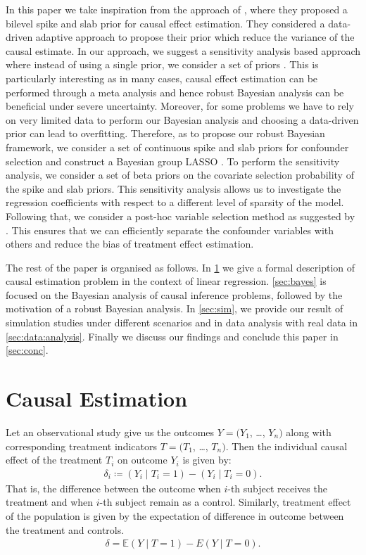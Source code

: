 \documentclass{amsart}
\begin{document}
In this paper we take inspiration from the approach of \citet{koch2020}, where
they proposed a bilevel spike and slab prior for causal effect 
estimation. They considered a data-driven adaptive approach to
propose their prior which reduce the variance of the causal estimate. 
In our approach,
we suggest a sensitivity analysis based approach where instead
of using a single prior, we consider a set of priors \cite{BERGER1990303}. This is particularly interesting as in
many cases, causal effect estimation can be performed through a 
meta analysis and hence robust Bayesian analysis can be beneficial
\cite{raices_cruz22} under severe uncertainty.
Moreover, for some problems we have to rely on very limited data to
perform our Bayesian analysis and choosing a data-driven prior
can lead to overfitting. Therefore, as to propose our
robust Bayesian framework,
we consider a set of continuous spike and slab priors \cite{ishwaran2005}
for confounder selection and construct a Bayesian group LASSO
\cite{xu2015}. To perform the sensitivity analysis, we consider
a set of beta priors on the covariate selection probability
of the spike and slab priors. This sensitivity analysis allows us
to investigate the regression coefficients with respect to a different
level of sparsity of the model. Following that, we consider a post-hoc
variable selection method as suggested by \citet{hahn2015}. This
ensures that we can efficiently separate the confounder variables
with others and reduce the bias of treatment effect estimation.

The rest of the paper is organised as follows. In \cref{sec:causal}
we give a formal description of causal estimation problem in the
context of linear regression. \cref{sec:bayes} is focused on the
Bayesian analysis of causal inference problems, followed by the
motivation of a robust Bayesian analysis. In \cref{sec:sim}, we
provide our result of simulation studies under different 
scenarios and in data analysis with real data in \cref{sec:data:analysis}. Finally we discuss our findings and 
conclude this paper in \cref{sec:conc}.

\section{Causal Estimation}\label{sec:causal}

Let an observational study give us the outcomes $Y=(Y_1$, \dots, $Y_n)$ along with 
corresponding treatment indicators $T=(T_1$, \dots, $T_n)$. Then the
individual causal
effect of the treatment $T_i$ on outcome $Y_i$ is given by:
\begin{align}
\delta_i \coloneqq (Y_i\mid T_i=1) - (Y_i\mid T_i=0).
\end{align}
That is, the difference between the outcome when $i$-th subject receives
the treatment and when $i$-th subject remain as a control. Similarly, treatment 
effect of the population is given by the expectation of difference
in outcome between the treatment and controls. 
\begin{align}
	\delta = \mathbb{E}(Y\mid T =1) - E(Y\mid T=0).
\end{align}
\end{document}
